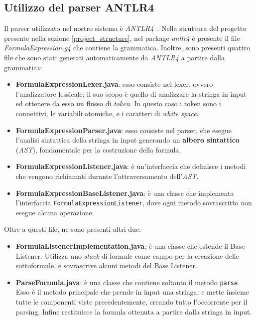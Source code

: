 \documentclass[a4paper,12pt]{report}
\begin{document}
\subsection{Utilizzo del parser ANTLR4}
Il parser utilizzato nel nostro sistema è \emph{ANTLR4}~\cite{antlr4, Parr13}. Nella struttura del progetto presente nella sezione \ref{project_structure}, nel package \emph{antlr4} è presente il file \emph{FormulaExpression.g4} che contiene la grammatica. Inoltre, sono presenti quattro file che sono stati generati automaticamente da \emph{ANTLR4} a partire dalla grammatica:
\begin{itemize}
    \item \textbf{FormulaExpressionLexer.java}:
    esso consiste nel lexer, ovvero l'analizzatore lessicale; il suo scopo è quello di analizzare la stringa in input ed ottenere da esso un flusso di \emph{token}. In questo caso i token sono i connettivi, le variabili atomiche, e i caratteri di \emph{white space}.
    \item \textbf{FormulaExpressionParser.java}:
    esso consiste nel parser, che esegue l'analisi sintattica della stringa in input generando un \textbf{albero sintattico} (\emph{AST}), fondamentale per la costruzione della formula.
    \item \textbf{FormulaExpressionListener.java}:
    è un'interfaccia che definisce i metodi che vengono richiamati durante l'attraversamento dell'\emph{AST}.
    \item \textbf{FormulaExpressionBaseListener.java}:
    è una classe che implementa l'interfaccia \texttt{FormulaExpressionListener}, dove ogni metodo sovrascritto non esegue alcuna operazione.
\end{itemize}
Oltre a questi file, ne sono presenti altri due:
\begin{itemize}
    \item \textbf{FormulaListenerImplementation.java}:
    è una classe che estende il Base Listener. Utilizza uno \emph{stack} di formule come campo per la creazione delle sottoformule, e sovrascrive alcuni metodi del Base Listener.
    \item \textbf{ParseFormula.java}:
    è una classe che contiene soltanto il metodo \texttt{parse}. Esso è il metodo principale che prende in input una stringa, e mette insieme tutte le componenti viste precedentemente, creando tutto l'occorrente per il parsing. Infine restituisce la formula ottenuta a partire dalla stringa in input.
\end{itemize}
\end{document}
